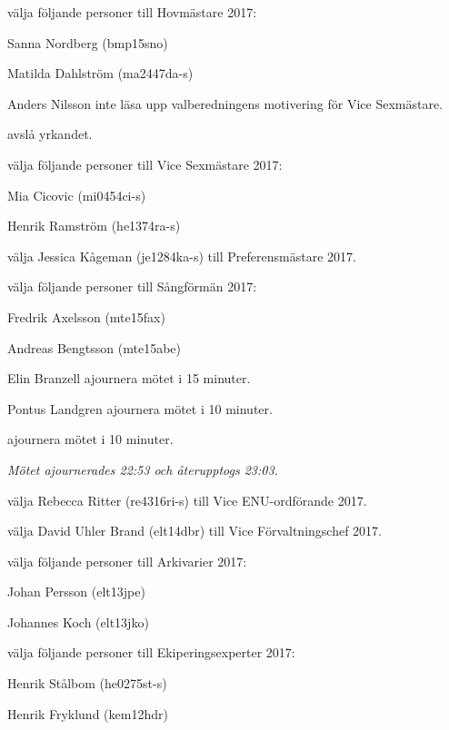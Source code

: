 \documentclass[10pt]{article}
\begin{document}
\begin{paragrafer}
\begin{paralist}
    \Mba välja följande personer till Hovmästare 2017:
    \begin{tightdashlist}
        \item Sanna Nordberg (bmp15sno)
        \item Matilda Dahlström (ma2447da-s)
    \end{tightdashlist}

    Anders Nilsson \ypa inte läsa upp valberedningens motivering för Vice Sexmästare.

    \Mba avslå yrkandet.

    \Mba välja följande personer till Vice Sexmästare 2017:
    \begin{tightdashlist}
        \item Mia Cicovic (mi0454ci-s)
        \item Henrik Ramström (he1374ra-s)
    \end{tightdashlist}

    \Mba välja Jessica Kågeman (je1284ka-s) till Preferensmästare 2017.

    \Mba välja följande personer till Sångförmän 2017:
    \begin{tightdashlist}
        \item Fredrik Axelsson (mte15fax)
        \item Andreas Bengtsson (mte15abe)
    \end{tightdashlist}

    Elin Branzell \ypa ajournera mötet i 15 minuter.

    Pontus Landgren \ypa ajournera mötet i 10 minuter.

    \Mba ajournera mötet i 10 minuter.

    \emph{Mötet ajournerades 22:53 och återupptogs 23:03.}

    \Mba välja Rebecca Ritter (re4316ri-s) till Vice ENU-ordförande 2017.

    \Mba välja David Uhler Brand (elt14dbr) till Vice Förvaltningschef 2017.

    \Mba välja följande personer till Arkivarier 2017:
    \begin{tightdashlist}
        \item Johan Persson (elt13jpe)
        \item Johannes Koch (elt13jko)
    \end{tightdashlist}

    \Mba välja följande personer till Ekiperingsexperter 2017:
    \begin{tightdashlist}
        \item Henrik Stålbom (he0275st-s)
        \item Henrik Fryklund (kem12hdr)
    \end{tightdashlist}


\end{paralist}
\end{paragrafer}
\end{document}
